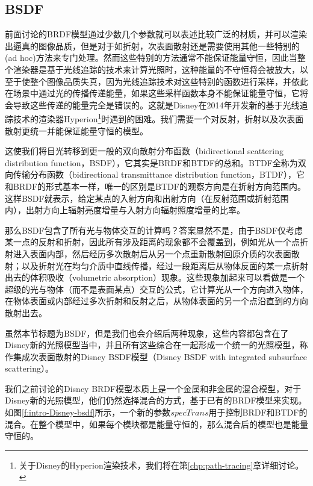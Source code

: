 \subsection{BSDF}\label{sec:intro-bsdf}
前面讨论的BRDF模型通过少数几个参数就可以表述比较广泛的材质，并可以渲染出逼真的图像品质，但是对于如折射，次表面散射还是需要使用其他一些特别的(ad hoc)方法来专门处理。然而这些特别的方法通常不能保证能量守恒，因此当整个渲染器是基于光线追踪的技术来计算光照时，这种能量的不守恒将会被放大，以至于使整个图像品质失真，因为光线追踪技术对这些特别的函数进行采样，并依此在场景中通过光的传播传递能量，如果这些采样函数本身不能保证能量守恒，它将会导致这些传递的能量完全是错误的。这就是Disney在2014年开发新的基于光线追踪技术的渲染器Hyperion\footnote{关于Disney的Hyperion渲染技术，我们将在第\ref{chp:path-tracing}章详细讨论。}时遇到的困难。我们需要一个对反射，折射以及次表面散射更统一并能保证能量守恒的模型。

这使我们将目光转移到更一般的双向散射分布函数（bidirectional scattering distribution function，BSDF），它其实是BRDF和BTDF的总和。BTDF全称为双向传输分布函数（bidirectional transmittance distribution function，BTDF），它和BRDF的形式基本一样，唯一的区别是BTDF的观察方向是在折射方向范围内。这样BSDF就表示，给定某点的入射方向和出射方向（在反射范围或折射范围内），出射方向上辐射亮度增量与入射方向辐射照度增量的比率。

那么BSDF包含了所有光与物体交互的计算吗？答案显然不是，由于BSDF仅考虑某一点的反射和折射，因此所有涉及距离的现象都不会覆盖到，例如光从一个点折射进入表面内部，然后经历多次散射后从另一个点重新散射回原介质的次表面散射；以及折射光在均匀介质中直线传播，经过一段距离后从物体反面的某一点折射出去的体积吸收（volumetric absorption）现象。这些现象加起来可以看做是一个超级的光与物体（而不是表面某点）交互的公式，它计算光从一个方向进入物体，在物体表面或内部经过多次折射和反射之后，从物体表面的另一个点沿直到的方向散射出去。

虽然本节标题为BSDF，但是我们也会介绍后两种现象，这些内容都包含在了Disney新的光照模型当中，并且所有这些综合在一起形成一个统一的光照模型，称作集成次表面散射的Disney BSDF模型\cite{a:ExtendingtheDisneyBRDFtoaBSDFwithIntegratedSubsurfaceScattering}（Disney BSDF with integrated subsurface scattering）。

我们之前讨论的Disney BRDF模型本质上是一个金属和非金属的混合模型，对于Disney新的光照模型，他们仍然选择混合的方式，基于已有的BRDF模型来实现。如图\ref{f:intro-Disney-bsdf}所示，一个新的参数$specTrans$用于控制BRDF和BTDF的混合。在整个模型中，如果每个模块都是能量守恒的，那么混合后的模型也是能量守恒的。

